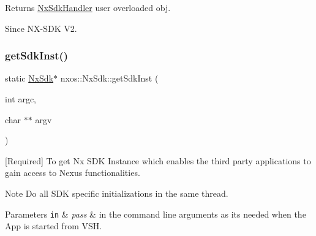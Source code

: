 \begin{DoxyReturn}{Returns}
\mbox{\hyperlink{classnxos_1_1_nx_sdk_handler}{Nx\+Sdk\+Handler}} user overloaded obj.
\end{DoxyReturn}
\begin{DoxySince}{Since}
N\+X-\/\+S\+DK V2. 
\end{DoxySince}
\mbox{\label{classnxos_1_1_nx_sdk_a5050e2d26c40744b4fc7862068a83f39}} 
\subsubsection{\texorpdfstring{get\+Sdk\+Inst()}{getSdkInst()}\hspace{0.1cm}{\footnotesize\ttfamily [1/4]}}
{\footnotesize\ttfamily static \mbox{\hyperlink{classnxos_1_1_nx_sdk}{Nx\+Sdk}}$\ast$ nxos\+::\+Nx\+Sdk\+::get\+Sdk\+Inst (\begin{DoxyParamCaption}\item[{int}]{argc,  }\item[{char $\ast$$\ast$}]{argv }\end{DoxyParamCaption})\hspace{0.3cm}{\ttfamily [static]}}

\mbox{[}Required\mbox{]} To get Nx S\+DK Instance which enables the third party applications to gain access to Nexus functionalities. \begin{DoxyNote}{Note}
Do all S\+DK specific initializations in the same thread. 
\end{DoxyNote}

\begin{DoxyParams}[1]{Parameters}
\mbox{\tt in}  & {\em pass} & in the command line arguments as its needed when the App is started from V\+SH.\\
\hline
\end{DoxyParams}

